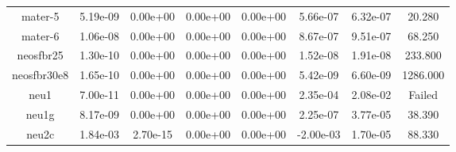 {{\begin{table}[h]
\begin{center}
{\begin{tabular}{cccccccc}
             mater-5 & 5.19e-09 & 0.00e+00 & 0.00e+00 & 0.00e+00 & 5.66e-07 & 6.32e-07 & 20.280 \\ 
             mater-6 & 1.06e-08 & 0.00e+00 & 0.00e+00 & 0.00e+00 & 8.67e-07 & 9.51e-07 & 68.250 \\ 
           neosfbr25 & 1.30e-10 & 0.00e+00 & 0.00e+00 & 0.00e+00 & 1.52e-08 & 1.91e-08 & 233.800 \\ 
         neosfbr30e8 & 1.65e-10 & 0.00e+00 & 0.00e+00 & 0.00e+00 & 5.42e-09 & 6.60e-09 & 1286.000 \\ 
                neu1 & 7.00e-11 & 0.00e+00 & 0.00e+00 & 0.00e+00 & 2.35e-04 & 2.08e-02 & Failed \\ 
               neu1g & 8.17e-09 & 0.00e+00 & 0.00e+00 & 0.00e+00 & 2.25e-07 & 3.77e-05 & 38.390 \\ 
               neu2c & 1.84e-03 & 2.70e-15 & 0.00e+00 & 0.00e+00 & -2.00e-03 & 1.70e-05 & 88.330 \\ 
      \bottomrule
    \end{tabular}
  }  
\end{center}
\end{table}}}

